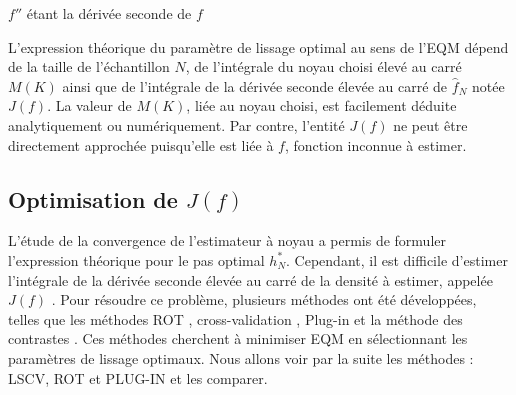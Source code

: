 $f''$  étant la dérivée seconde de $f$

L’expression théorique du paramètre de lissage optimal au sens de l'EQM dépend de la taille de l’échantillon $N$, de l’intégrale du noyau choisi élevé au carré $M(K)$ ainsi que de l’intégrale de la dérivée seconde élevée au carré de ${\hat f}_N$ notée $J(f)$. La valeur de $M(K)$, liée au noyau choisi, est facilement déduite analytiquement ou numériquement. Par contre, l’entité $J(f)$  ne peut être directement approchée puisqu’elle est liée à $f$, fonction inconnue à estimer.

\subsection{Optimisation de $J(f)$}
L'étude de la convergence de l'estimateur à noyau a permis de formuler l'expression théorique pour le pas optimal $h^*_N$. Cependant, il est difficile d'estimer l'intégrale de la dérivée seconde élevée au carré de la densité à estimer, appelée $J(f)$ . Pour résoudre ce problème, plusieurs méthodes ont été développées, telles que les méthodes ROT  , cross-validation , Plug-in  et la méthode des contrastes . Ces méthodes cherchent à minimiser EQM en sélectionnant les paramètres de lissage optimaux. Nous allons voir par la suite les méthodes : LSCV, ROT et PLUG-IN et les comparer. 

